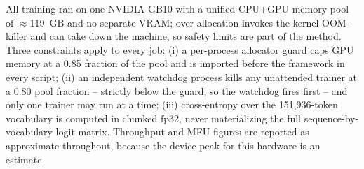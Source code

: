 All training ran on one NVIDIA GB10 with a unified CPU+GPU memory pool of
$\approx$119~GB and no separate VRAM; over-allocation invokes the kernel
OOM-killer and can take down the machine, so safety limits are part of the
method. Three constraints apply to every job: (i) a per-process allocator guard
caps GPU memory at a 0.85 fraction of the pool and is imported before the
framework in every script; (ii) an independent watchdog process kills any
unattended trainer at a 0.80 pool fraction -- strictly below the guard, so the
watchdog fires first -- and only one trainer may run at a time; (iii)
cross-entropy over the 151{,}936-token vocabulary is computed in chunked fp32,
never materializing the full sequence-by-vocabulary logit matrix. Throughput
and MFU figures are reported as approximate throughout, because the device peak
for this hardware is an estimate.
